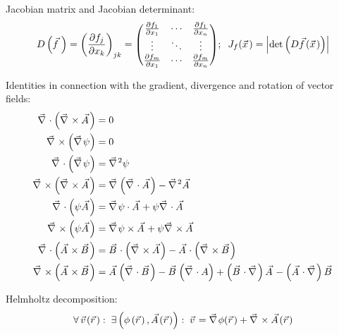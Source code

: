 			\noindent
			Jacobian matrix and Jacobian determinant:
			\begin{equation}
				D\left(\vec{f}\,\right) = \left(\frac{\partial f_j}{\partial x_k}\right)_{jk}
				= \mqty(
				\frac{\partial f_1}{\partial x_1} & \dotsb & \frac{\partial f_1}{\partial x_n} \\
				\vdots & \ddots & \vdots \\
				\frac{\partial f_m}{\partial x_1} & \dotsb & \frac{\partial f_m}{\partial x_n} \\
				);\;\;J_f(\vec{x})=\abs{\det\left(D\vec{f}(\vec{x})\right)}
			\end{equation}

			\noindent
			Identities in connection with the gradient, divergence and rotation of vector fields:
			\begin{equation}
				\begin{aligned}
					\Nabla\cdot\left(\Nabla\times\vec{A}\right) &= 0 \\
					\Nabla\times\left(\Nabla\psi\right) &= 0 \\
					\Nabla\cdot\left(\Nabla\psi\right) &= \Nabla^2\psi \\
					\Nabla\times\left(\Nabla\times\vec{A}\right) &= \Nabla\left(\Nabla\cdot\vec{A}\right) -\Nabla^2\vec{A} \\
					\Nabla\cdot\left(\psi\vec{A}\right) &= \Nabla\psi\cdot\vec{A} + \psi\Nabla\cdot\vec{A}\\
					\Nabla\times\left(\psi\vec{A}\right) &= \Nabla\psi\times\vec{A} + \psi\Nabla\times\vec{A} \\
					\Nabla\cdot\left(\vec{A}\times\vec{B}\right) &= \vec{B}\cdot\left(\Nabla\times\vec{A}\right) - 	\vec{A}\cdot\left(\Nabla\times\vec{B}\right) \\
					\Nabla\times\left(\vec{A}\times\vec{B}\right) &= \vec{A}\left(\Nabla\cdot\vec{B}\right) - \vec{B}\left(\Nabla\cdot{A}\right) + \left(\vec{B}\cdot\Nabla\right)\vec{A} - \left(\vec{A}\cdot\Nabla\right)\vec{B} \\
				\end{aligned}
			\end{equation}

			\noindent
			Helmholtz decomposition:
			\begin{equation}
				\forall \,\vec{v}(\vec{r}):\; \exists\left(\phi\left(\vec{r}\right),\vec{A}(\vec{r})\right):\;\vec{v} = \Nabla\phi(\vec{r}) + 	\Nabla\times\vec{A}(\vec{r})
			\end{equation}

